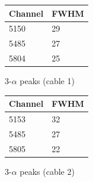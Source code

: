 \begin{figure}[h]
  \centering
  \begin{minipage}[b]{0.45\textwidth}
    \centering
  \begin{tabular}{ll}
    Channel & FWHM \\
    \midrule
    5150 & \num{29} \\
    5485 & \num{27} \\
    5804 & \num{25} \\
    \bottomrule
  \end{tabular}
  \caption{3-$\alpha$ peaks (cable 1)}
  \label{res:peaks:cab1}
  \end{minipage}
  \hfill
  \begin{minipage}[b]{0.45\textwidth}
    \centering
  \begin{tabular}{ll}
    Channel & FWHM \\
    \midrule
    5153 & \num{32} \\
    5485 & \num{27} \\
    5805 & \num{22} \\
    \bottomrule
  \end{tabular}
  \caption{3-$\alpha$ peaks (cable 2)}
  \label{res:peaks:cab2}
  \end{minipage}
\end{figure}